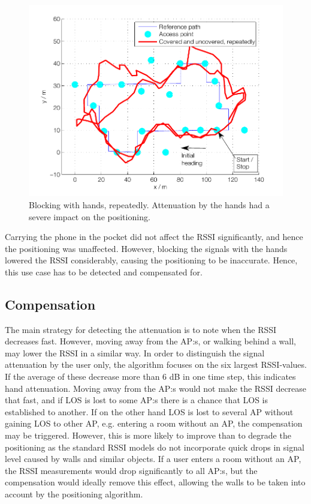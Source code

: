 \documentclass{LTHthesis}
\begin{document}
\begin{figure}[!hbt]

\includegraphics[width=1\textwidth ]{images/adapt_parameters/hand_block_repeatedly}
\caption{Blocking with hands, repeatedly. Attenuation by the hands had a severe impact on the positioning.}\label{hand_block_repeatedly}
\end{figure}
%
Carrying the phone in the pocket did not affect the RSSI significantly, and hence the positioning was unaffected. However, blocking the signals with the hands lowered the RSSI considerably, causing the positioning to be inaccurate. Hence, this use case has to be detected and compensated for.

\subsection{Compensation}

The main strategy for detecting the attenuation is to note when the RSSI decreases fast. However, moving away from the AP:s, or walking behind a wall, may lower the RSSI in a similar way. In order to distinguish the signal attenuation by the user only, the algorithm focuses on the six largest RSSI-values. If the average of these decrease more than 6 dB in one time step, this indicates hand attenuation. Moving away from the AP:s would not make the RSSI decrease that fast, and if LOS is lost to some AP:s there is a chance that LOS is established to another. If on the other hand LOS is lost to several AP without gaining LOS to other AP, e.g. entering a room without an AP, the compensation may be triggered. However, this is more likely to improve than to degrade the positioning as the standard RSSI models do not incorporate quick drops in signal level caused by walls and similar objects. If a user enters a room without an AP, the RSSI measurements would drop significantly to all AP:s, but the compensation would ideally remove this effect, allowing the walls to be taken into account by the positioning algorithm. 
\end{document}
